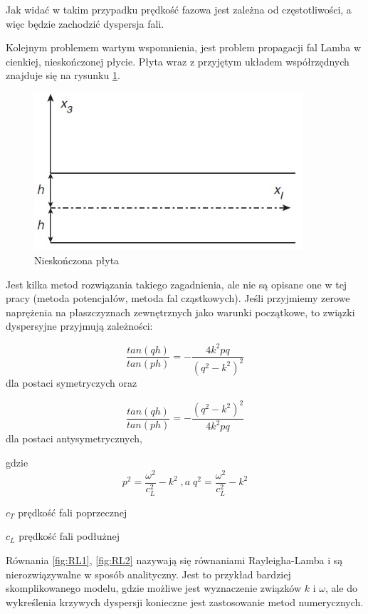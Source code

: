 Jak widać w takim przypadku prędkość fazowa jest zależna od częstotliwości, a więc będzie zachodzić dyspersja fali.

\vspace{3mm}

Kolejnym problemem wartym wspomnienia, jest problem propagacji fal Lamba w cienkiej, nieskończonej płycie. Płyta wraz z przyjętym układem współrzędnych znajduje się na rysunku \ref{fig:nieskonczona_plyta}.

\begin{figure}[h]
\centering
\includegraphics[width=10cm]{Zdjecia/2/dyspersja_analitycznie_plyta}
\caption{Nieskończona płyta}
\label{fig:nieskonczona_plyta}
\end{figure}

Jest kilka metod rozwiązania takiego zagadnienia, ale nie są opisane one w tej pracy (metoda potencjałów, metoda fal cząstkowych). Jeśli przyjmiemy zerowe naprężenia na płaszczyznach zewnętrznych jako warunki początkowe, to związki dyspersyjne przyjmują zależności:

\begin{equation}\label{fig:RL1}
\frac{tan(qh)}{tan(ph)}=-\frac{4k^2pq}{(q^2-k^2)^2}
\end{equation}
dla postaci symetryczych oraz

\begin{equation}\label{fig:RL2}
\frac{tan(qh)}{tan(ph)}=-\frac{(q^2-k^2)^2}{4k^2pq}
\end{equation}
dla postaci antysymetrycznych,

gdzie
\begin{equation}
p^2=\frac{\omega^2}{c_L^2} - k^2 \; ,a \; q^2=\frac{\omega^2}{c_L^2}-k^2
\end{equation}

\begin{eqwhere}[2cm]
        \item[$c_T$] prędkość fali poprzecznej
	\item[$c_L$] prędkość fali podłużnej
\end{eqwhere}

Równania \ref{fig:RL1}, \ref{fig:RL2} nazywają się równaniami Rayleigha-Lamba i są nierozwiązywalne w sposób analityczny. Jest to przykład bardziej skomplikowanego modelu, gdzie możliwe jest wyznaczenie związków \(k\) i \(\omega\), ale do wykreślenia krzywych dyspersji konieczne jest zastosowanie metod numerycznych.
